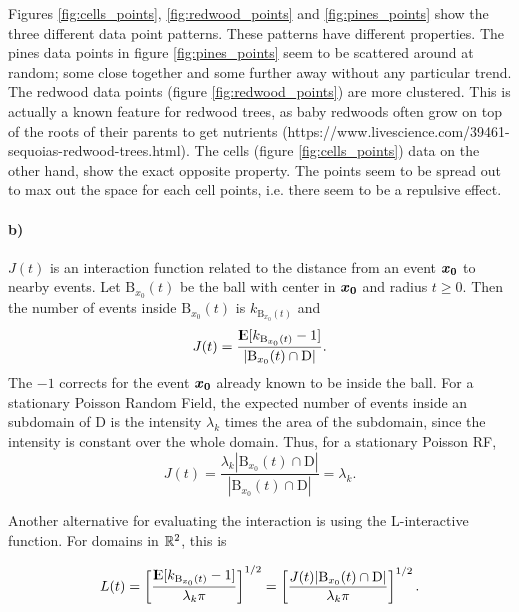 Figures \ref{fig:cells_points}, \ref{fig:redwood_points} and \ref{fig:pines_points} show the three different data point patterns. These patterns have different properties. The pines data points in figure \ref{fig:pines_points} seem to be scattered around at random; some close together and some further away without any particular trend. The redwood data points (figure \ref{fig:redwood_points}) are more clustered. This is actually a known feature for redwood trees, as baby redwoods often grow on top of the roots of their parents to get nutrients (https://www.livescience.com/39461-sequoias-redwood-trees.html). The cells (figure \ref{fig:cells_points}) data on the other hand, show the exact opposite property. The points seem to be spread out to max out the space for each cell points, i.e. there seem to be a repulsive effect.

\paragraph{b)}

$J(t)$ is an interaction function related to the distance from an event $\bm{x_0}$ to nearby events. Let $\textrm{B}_{x_0}(t)$ be the ball with center in $\bm{x_0}$ and radius $t \geq 0$. Then the number of events inside $\textrm{B}_{x_0}(t)$ is $k_{\textrm{B}_{x_0}(t)}$ and
\begin{equation}
    J(t) = \frac{{\rm I\kern-.3em E}{[k_{\textrm{B}_{x_0}(t)}-1]}}{|\textrm{B}_{x_0}(t) \cap \textrm{D}|}.
\end{equation}
The $-1$ corrects for the event $\bm{x_0}$ already known to be inside the ball. For a stationary Poisson Random Field, the expected number of events inside an subdomain of D is the intensity $\lambda_k$ times the area of the subdomain, since the intensity is constant over the whole domain. Thus, for a stationary Poisson RF, 
\begin{equation}
    J(t) = \frac{\lambda_k |\textrm{B}_{x_0}(t) \cap \textrm{D}|}{|\textrm{B}_{x_0}(t) \cap \textrm{D}|} = \lambda_k.
\end{equation}

Another alternative for evaluating the interaction is using the L-interactive function. For domains in $\mathbb{R}^2$, this is

\begin{equation}
    L(t) = \left[\frac{{\rm I\kern-.3em E}{[k_{\textrm{B}_{x_0}(t)}-1]}}{\lambda_k \pi}\right]^{1/2} = \left[\frac{J(t)|\textrm{B}_{x_0}(t) \cap \textrm{D}|}{\lambda_k \pi}\right]^{1/2}.
\end{equation}

